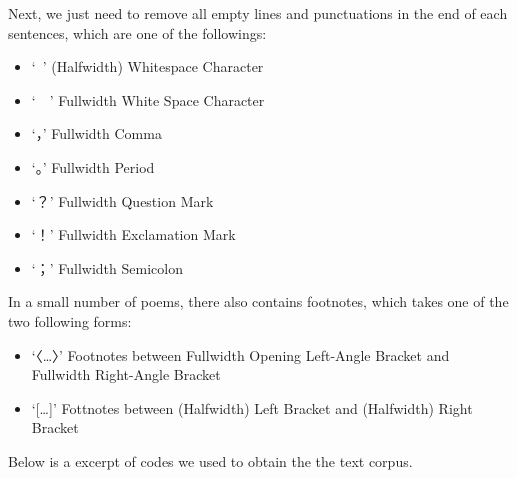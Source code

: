\documentclass[]{article}
\newenvironment{Shaded}{\begin{snugshade}}{\end{snugshade}}
\newcommand{\CharTok}[1]{\textcolor[rgb]{0.31,0.60,0.02}{#1}}
\newcommand{\CommentTok}[1]{\textcolor[rgb]{0.56,0.35,0.01}{\textit{#1}}}
\newcommand{\DataTypeTok}[1]{\textcolor[rgb]{0.13,0.29,0.53}{#1}}
\newcommand{\KeywordTok}[1]{\textcolor[rgb]{0.13,0.29,0.53}{\textbf{#1}}}
\newcommand{\NormalTok}[1]{#1}
\newcommand{\OperatorTok}[1]{\textcolor[rgb]{0.81,0.36,0.00}{\textbf{#1}}}
\newcommand{\StringTok}[1]{\textcolor[rgb]{0.31,0.60,0.02}{#1}}
\providecommand{\tightlist}{%
  \setlength{\itemsep}{0pt}\setlength{\parskip}{0pt}}
\begin{document}
Next, we just need to remove all empty lines and punctuations in the end
of each sentences, which are one of the followings:

\begin{itemize}
\tightlist
\item
  `~' (Halfwidth) Whitespace Character
\item
  `　' Fullwidth White Space Character
\item
  `，' Fullwidth Comma
\item
  `。' Fullwidth Period
\item
  `？' Fullwidth Question Mark
\item
  `！' Fullwidth Exclamation Mark
\item
  `；' Fullwidth Semicolon
\end{itemize}

In a small number of poems, there also contains footnotes, which takes
one of the two following forms:

\begin{itemize}
\tightlist
\item
  `〈\ldots{}〉' Footnotes between Fullwidth Opening Left-Angle Bracket
  and Fullwidth Right-Angle Bracket
\item
  `{[}\ldots{}{]}' Fottnotes between (Halfwidth) Left Bracket and
  (Halfwidth) Right Bracket
\end{itemize}

Below is a excerpt of codes we used to obtain the the text corpus.

\begin{Shaded}
\end{Shaded}
\end{document}
